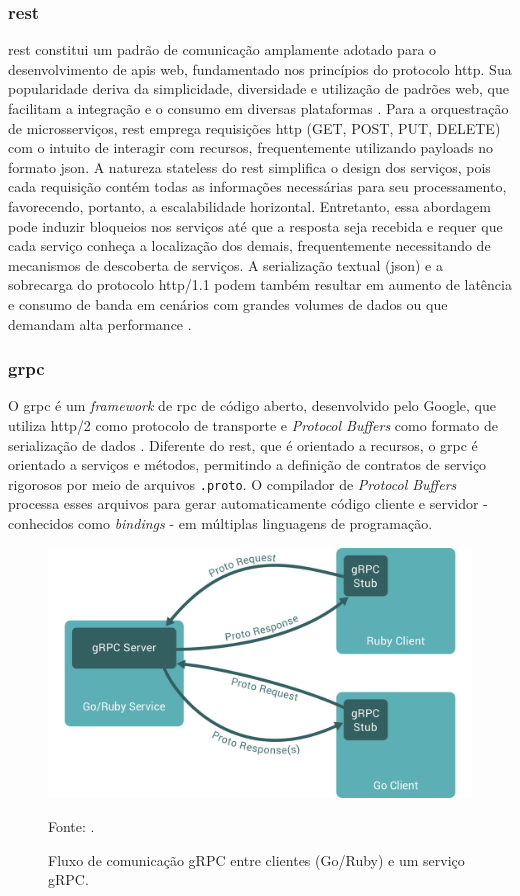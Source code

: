 \subsubsection{\acrfull{rest}}

\gls{rest} constitui um padrão de comunicação amplamente adotado para o desenvolvimento de \gls{api}s web, fundamentado nos princípios do protocolo \gls{http}. Sua popularidade deriva da simplicidade, diversidade e utilização de padrões web, que facilitam a integração e o consumo em diversas plataformas \cite{mozilla_rest_2023}. Para a orquestração de microsserviços, \gls{rest} emprega requisições \gls{http} (GET, POST, PUT, DELETE) com o intuito de interagir com recursos, frequentemente utilizando payloads no formato \acrshort{json}. A natureza stateless do \gls{rest} simplifica o design dos serviços, pois cada requisição contém todas as informações necessárias para seu processamento, favorecendo, portanto, a escalabilidade horizontal. Entretanto, essa abordagem pode induzir bloqueios nos serviços até que a resposta seja recebida e requer que cada serviço conheça a localização dos demais, frequentemente necessitando de mecanismos de descoberta de serviços. A serialização textual (\acrshort{json}) e a sobrecarga do protocolo \gls{http}/1.1 podem também resultar em aumento de latência e consumo de banda em cenários com grandes volumes de dados ou que demandam alta performance \cite{mozilla_rest_2023}.

\subsubsection{\acrfull{grpc}}

O \acrshort{grpc} é um \textit{framework} de \acrfull{rpc} de código aberto, desenvolvido pelo Google, que utiliza \acrshort{http}/2 como protocolo de transporte e \textit{Protocol Buffers} como formato de serialização de dados \cite{google_grpc_nodate}. Diferente do \acrshort{rest}, que é orientado a recursos, o \acrshort{grpc} é orientado a serviços e métodos, permitindo a definição de contratos de serviço rigorosos por meio de arquivos \texttt{.proto}. O compilador de \textit{Protocol Buffers} processa esses arquivos para gerar automaticamente código cliente e servidor - conhecidos como \textit{bindings} - em múltiplas linguagens de programação.

\begin{figure}[H]
    \caption{Fluxo de comunicação gRPC entre clientes (Go/Ruby) e um serviço gRPC.}
    \label{fig:2-grpc-fluxo}
    \centering
    \includegraphics[width=0.5\linewidth]{imagens/2-gRPC-Flow.png}    
    {\par \raggedright \footnotesize Fonte: \textcite{google_grpc_nodate}.\par}
\end{figure}

